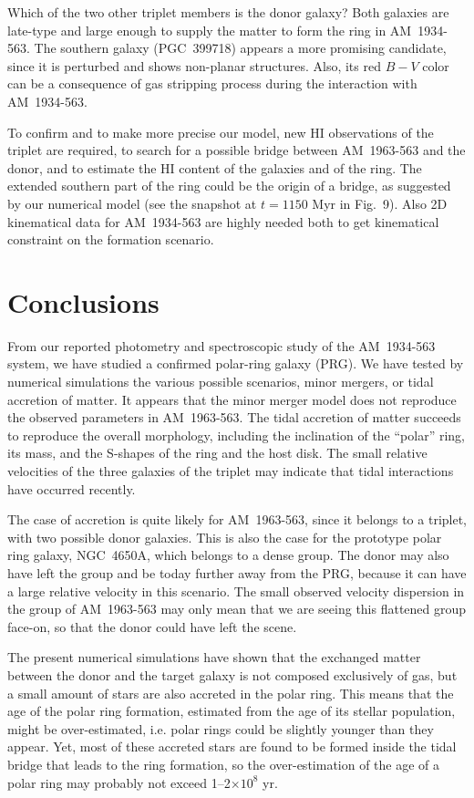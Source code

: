 \documentclass[]{aa}
\begin{document}
Which of the two other triplet members is the donor galaxy? Both galaxies 
are late-type and large enough to supply the matter to form the ring in 
AM~1934-563. The southern galaxy (PGC~399718) appears a more promising 
candidate, since it is perturbed and shows non-planar structures. Also, 
its red $B-V$ color can be a consequence of gas stripping process during 
the interaction with AM~1934-563. 

To confirm and to make more precise our model, new HI observations of 
the triplet 
are required, to search for a possible bridge between AM~1963-563 and 
the donor, and to estimate the HI content of the galaxies and of the ring. 
The extended southern part of the ring could be the origin of a bridge, 
as suggested by our numerical model (see the snapshot at $t=1150$ Myr in 
Fig.~9). Also 2D kinematical data for AM~1934-563 are highly needed 
both to get kinematical constraint on the formation scenario.

\section{Conclusions}

From our reported photometry and spectroscopic study of the AM~1934-563 
system, we have studied a confirmed polar-ring galaxy (PRG). We have 
tested by numerical simulations the various possible scenarios, minor 
mergers, or tidal accretion of matter. It appears that the minor merger 
model does not reproduce the observed parameters in AM~1963-563. The tidal 
accretion of matter succeeds to reproduce the overall morphology, including 
the inclination of the ``polar'' ring, its mass, and the S-shapes of 
the ring and the host disk. The small relative velocities of the 
three galaxies of the triplet may indicate that tidal interactions 
have occurred recently.

The case of accretion is quite likely for AM~1963-563, since it belongs 
to a triplet, with two possible donor galaxies. This is also the case 
for the prototype polar ring galaxy, NGC~4650A, which belongs to a dense 
group. The donor may also have left the group and be today further away 
from the PRG, because it can have a large relative velocity in this 
scenario. The small observed velocity dispersion in the group of AM~1963-563 
may only mean that we are seeing this flattened group face-on, 
so that the donor could have left the scene.

The present numerical simulations have shown that the exchanged 
matter between the donor and the target galaxy is not composed 
exclusively of gas, but a small amount of stars are also accreted in 
the polar ring. This means that the age of the polar ring formation, 
estimated from the age of its stellar population, might be over-estimated, 
i.e. polar rings could be slightly younger than they appear. Yet, most 
of these accreted stars are found to be formed inside the tidal bridge 
that leads to the ring formation, so the over-estimation of the age 
of a polar ring may probably not exceed 1--2$\times10^8$ yr.
\end{document}
